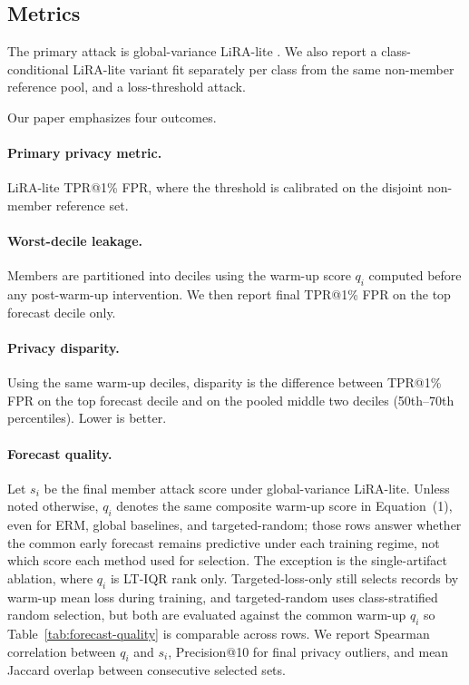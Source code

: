 \documentclass{article}
\newcommand{\lira}{LiRA-lite}
\begin{document}
\subsection{Metrics}

The primary attack is global-variance \lira{} \citep{carlini2022membership}. We also report a class-conditional \lira{} variant fit separately per class from the same non-member reference pool, and a loss-threshold attack.

Our paper emphasizes four outcomes.
\paragraph{Primary privacy metric.}
\lira{} TPR@1\% FPR, where the threshold is calibrated on the disjoint non-member reference set.
\paragraph{Worst-decile leakage.}
Members are partitioned into deciles using the warm-up score $q_i$ computed before any post-warm-up intervention. We then report final TPR@1\% FPR on the top forecast decile only.
\paragraph{Privacy disparity.}
Using the same warm-up deciles, disparity is the difference between TPR@1\% FPR on the top forecast decile and on the pooled middle two deciles (50th--70th percentiles). Lower is better.
\paragraph{Forecast quality.}
Let $s_i$ be the final member attack score under global-variance \lira{}. Unless noted otherwise, $q_i$ denotes the same composite warm-up score in Equation~(1), even for ERM, global baselines, and targeted-random; those rows answer whether the common early forecast remains predictive under each training regime, not which score each method used for selection. The exception is the single-artifact ablation, where $q_i$ is LT-IQR rank only. Targeted-loss-only still selects records by warm-up mean loss during training, and targeted-random uses class-stratified random selection, but both are evaluated against the common warm-up $q_i$ so Table~\ref{tab:forecast-quality} is comparable across rows. We report Spearman correlation between $q_i$ and $s_i$, Precision@10 for final privacy outliers, and mean Jaccard overlap between consecutive selected sets.
\end{document}
